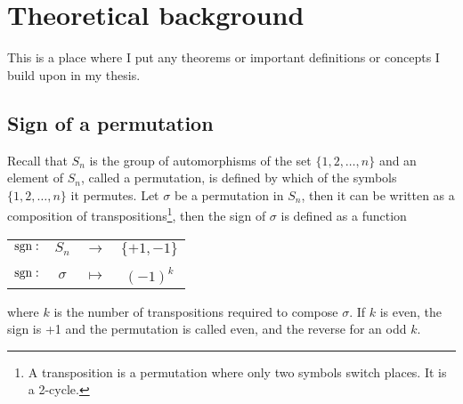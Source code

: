 \clearpage{\thispagestyle{empty}}
\section{Theoretical background}
	
	This is a place where I put any theorems or important definitions or concepts I build upon in my thesis.
	
	\subsection{Sign of a permutation}

		Recall that $S_n$ is the group of automorphisms of the set $\{1, 2, \dots, n\}$ and an element of $S_n$, called a permutation, is defined by which of the symbols $\{1, 2, \dots, n\}$ it permutes. Let $\sigma$ be a permutation in $S_n$, then it can be written as a composition of transpositions\footnote{A transposition is a permutation where only two symbols switch places. It is a 2-cycle.}, then the sign of $\sigma$ is defined as a function
		\begin{table}[hbt!]\centering\begin{tabular}{c c c c}
			$\text{sgn}:$ & $S_n$    & $\rightarrow$ & $\{+1, -1\}$ \\
			&\rotatebox[origin=c]{90}{$\in$}&&\rotatebox[origin=c]{90}{$\in$} \\
			$\text{sgn}:$ & $\sigma$ & $\mapsto$     & $(-1)^k$
		\end{tabular}\end{table}
		where $k$ is the number of transpositions required to compose $\sigma$. If $k$ is even, the sign is +1 and the permutation is called even, and the reverse for an odd $k$.